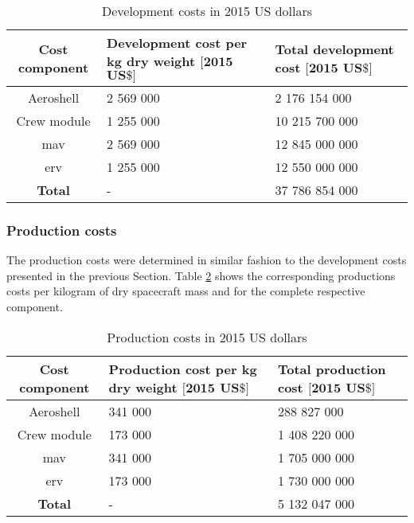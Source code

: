 \begin{table}[h]
	\centering
	\caption{Development costs in 2015 US dollars}
	\begin{tabular}{|c|p{5cm}|p{5cm}|}
		\hline
		\textbf{Cost component} & \textbf{Development cost per kg dry weight $\mathbf{[2015}$ $\mathbf{US\$]}$} & \textbf{Total development cost $\mathbf{[2015}$ $\mathbf{US\$]}$} \\ \hline \hline
		Aeroshell & 2 569 000 & 2 176 154 000 \\
		Crew module & 1 255 000 & 10 215 700 000 \\
		\acrlong{mav} & 2 569 000 & 12 845 000 000 \\
		\acrlong{erv} & 1 255 000 & 12 550 000 000 \\ \hline
		\textbf{Total} & - & 37 786 854 000 \\
		\hline
	\end{tabular}
	\label{tab:devcosts}
\end{table}

\subsubsection{Production costs}
The production costs were determined in similar fashion to the development costs presented in the previous Section. Table \ref{tab:productioncosts} shows the corresponding productions costs per kilogram of dry spacecraft mass and for the complete respective component.
\begin{table}[h]
	\centering
	\caption{Production costs in 2015 US dollars}
	\begin{tabular}{|c|p{5cm}|p{5cm}|}
		\hline
		\textbf{Cost component} & \textbf{Production cost per kg dry weight $\mathbf{[2015}$ $\mathbf{US\$]}$} & \textbf{Total production cost $\mathbf{[2015}$ $\mathbf{US\$]}$} \\
		\hline \hline
		Aeroshell & 341 000 & 288 827 000 \\
		Crew module & 173 000 & 1 408 220 000 \\ 
		\acrlong{mav} & 341 000 & 1 705 000 000 \\
		\acrlong{erv} & 173 000 & 1 730 000 000 \\ \hline
		\textbf{Total} & - & 5 132 047 000 \\
		\hline
	\end{tabular}
	\label{tab:productioncosts}
\end{table}

